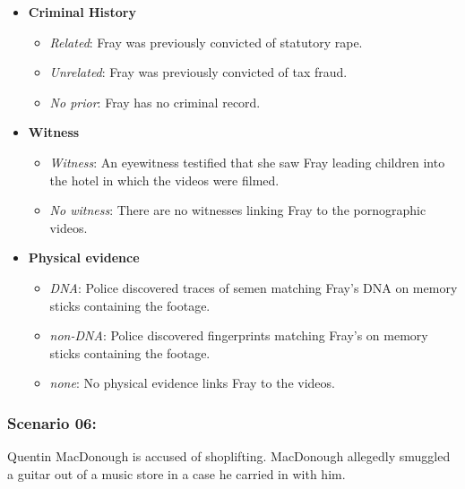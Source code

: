 \documentclass[
]{article}
\providecommand{\tightlist}{%
  \setlength{\itemsep}{0pt}\setlength{\parskip}{0pt}}
\begin{document}
\begin{itemize}
\tightlist
\item
  \textbf{Criminal History}

  \begin{itemize}
  \tightlist
  \item
    \emph{Related}: Fray was previously convicted of statutory rape.
  \item
    \emph{Unrelated}: Fray was previously convicted of tax fraud.
  \item
    \emph{No prior}: Fray has no criminal record.
  \end{itemize}
\item
  \textbf{Witness}

  \begin{itemize}
  \tightlist
  \item
    \emph{Witness}: An eyewitness testified that she saw Fray leading
    children into the hotel in which the videos were filmed.
  \item
    \emph{No witness}: There are no witnesses linking Fray to the
    pornographic videos.
  \end{itemize}
\item
  \textbf{Physical evidence}

  \begin{itemize}
  \tightlist
  \item
    \emph{DNA}: Police discovered traces of semen matching Fray's DNA on
    memory sticks containing the footage.
  \item
    \emph{non-DNA}: Police discovered fingerprints matching Fray's on
    memory sticks containing the footage.
  \item
    \emph{none}: No physical evidence links Fray to the videos.
  \end{itemize}
\end{itemize}

\hypertarget{scenario-06}{%
\subsubsection{Scenario 06:}\label{scenario-06}}

Quentin MacDonough is accused of shoplifting. MacDonough allegedly
smuggled a guitar out of a music store in a case he carried in with him.
\end{document}
